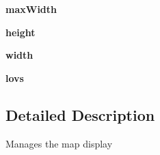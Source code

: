 \begin{DoxyCompactItemize}
\item 
\hypertarget{classinterface_1_1cursescli_1_1_map_view_af2ad8dfaad4433e0e4e9e8d906ca1e4a}{{\bfseries max\-Width}}\label{classinterface_1_1cursescli_1_1_map_view_af2ad8dfaad4433e0e4e9e8d906ca1e4a}

\item 
\hypertarget{classinterface_1_1cursescli_1_1_map_view_a89ce02532a85956e4ed40d542a8dee05}{{\bfseries height}}\label{classinterface_1_1cursescli_1_1_map_view_a89ce02532a85956e4ed40d542a8dee05}

\item 
\hypertarget{classinterface_1_1cursescli_1_1_map_view_a43149a1b807de32ab262bd356955b842}{{\bfseries width}}\label{classinterface_1_1cursescli_1_1_map_view_a43149a1b807de32ab262bd356955b842}

\item 
\hypertarget{classinterface_1_1cursescli_1_1_map_view_ae22ec0cc3de12de2abc3df53b4838b27}{{\bfseries lovs}}\label{classinterface_1_1cursescli_1_1_map_view_ae22ec0cc3de12de2abc3df53b4838b27}

\end{DoxyCompactItemize}


\subsection{\-Detailed \-Description}
\begin{DoxyVerb}Manages the map display \end{DoxyVerb}
 

